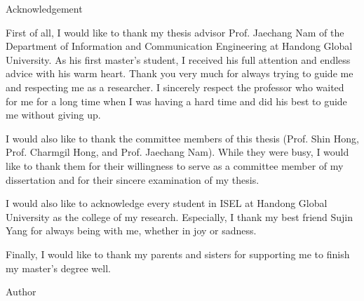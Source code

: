 
\clearpage
\thispagestyle{empty}
\begin{center}
    \fontsize{12}{20} \selectfont Acknowledgement
\end{center}
\par

First of all, I would like to thank my thesis advisor Prof. Jaechang Nam of the Department of Information and Communication Engineering at Handong Global University. As his first master’s student, I received his full attention and endless advice with his warm heart. Thank you very much for always trying to guide me and respecting me as a researcher. I sincerely respect the professor who waited for me for a long time when I was having a hard time and did his best to guide me without giving up. 

I would also like to thank the committee members of this thesis (Prof. Shin Hong, Prof. Charmgil Hong, and Prof. Jaechang Nam). While they were busy, I would like to thank them for their willingness to serve as a committee member of my dissertation and for their sincere examination of my thesis. 

I would also like to acknowledge every student in ISEL at Handong Global University as the college of my research. Especially, I thank my best friend Sujin Yang for always being with me, whether in joy or sadness.

Finally, I would like to thank my parents and sisters for supporting me to finish my master's degree well. 

\bigskip
\noindent
Author

\noindent
\Author

